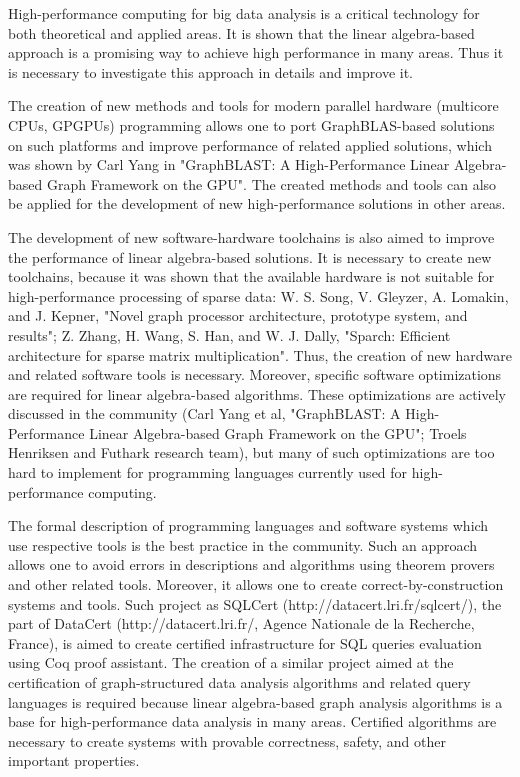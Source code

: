 \documentclass[12pt]{article}  %
\theoremstyle{remark}
\begin{document}
High-performance computing for big data analysis is a critical technology for both theoretical and applied areas. It is shown that the linear algebra-based approach is a promising way to achieve high performance in many areas. Thus it is necessary to investigate this approach in details and improve it.

The creation of new methods and tools for modern parallel hardware (multicore CPUs, GPGPUs) programming allows one to port GraphBLAS-based solutions on such platforms and improve performance of related applied solutions, which was shown by Carl Yang in "GraphBLAST: A High-Performance Linear Algebra-based Graph Framework on the GPU". The created methods and tools can also be applied for the development of new high-performance solutions in other areas.

The development of new software-hardware toolchains is also aimed to improve the performance of linear algebra-based solutions. It is necessary to create new toolchains, because it was shown that the available hardware is not suitable for high-performance processing of sparse data:  W. S. Song, V. Gleyzer, A. Lomakin, and J. Kepner, "Novel graph processor architecture, prototype system, and results"; Z. Zhang, H. Wang, S. Han, and W. J. Dally, "Sparch: Efficient architecture for sparse matrix multiplication". Thus, the creation of new hardware and related software tools is necessary. Moreover, specific software optimizations are required for linear algebra-based algorithms. These optimizations are actively discussed in the community (Carl Yang et al, "GraphBLAST: A High-Performance Linear Algebra-based Graph Framework on the GPU"; Troels Henriksen and Futhark research team), but many of such optimizations are too hard to implement for programming languages currently used for high-performance computing.

The formal description of programming languages and software systems which use respective tools is the best practice in the community. Such an approach allows one to avoid errors in descriptions and algorithms using theorem provers and other related tools. Moreover, it allows one to create correct-by-construction systems and tools. Such project as SQLCert (http://datacert.lri.fr/sqlcert/), the part of DataCert (http://datacert.lri.fr/, Agence Nationale de la Recherche, France), is aimed to create certified infrastructure for SQL queries evaluation using Coq proof assistant. The creation of a similar project aimed at the certification of graph-structured data analysis algorithms and related query languages is required because linear algebra-based graph analysis algorithms is a base for high-performance data analysis in many areas. Certified algorithms are necessary to create systems with provable correctness, safety, and other important properties. 
\end{document}
